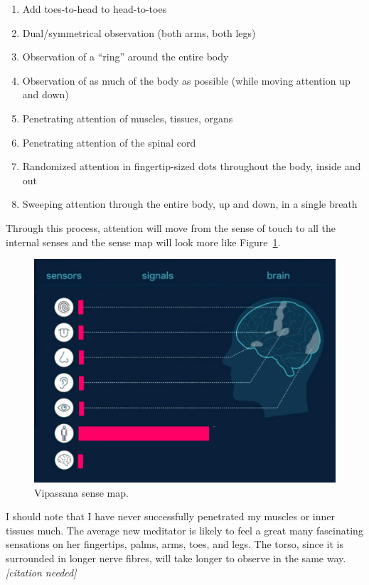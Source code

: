\documentclass{article}
\begin{document}
\begin{enumerate}
  \item Add toes-to-head to head-to-toes
  \item Dual/symmetrical observation (both arms, both legs)
  \item Observation of a ``ring'' around the entire body
  \item Observation of as much of the body as possible (while moving attention up and down)
  \item Penetrating attention of muscles, tissues, organs
  \item Penetrating attention of the spinal cord
  \item Randomized attention in fingertip-sized dots throughout the body, inside and out
  \item Sweeping attention through the entire body, up and down, in a single breath
\end{enumerate}

Through this process, attention will move from the sense of touch to all the internal senses and the sense map will look more like Figure~\ref{fig:vipassana-sense-map-1}.

\begin{figure}[H]
  \centering
  \includegraphics[width=\linewidth]{images/ma-vipassana1.png}
  \caption{Vipassana sense map.}
  \label{fig:vipassana-sense-map-1}
\end{figure}

I should note that I have never successfully penetrated my muscles or inner tissues much. The average new meditator is likely to feel a great many fascinating sensations on her fingertips, palms, arms, toes, and legs. The torso, since it is surrounded in longer nerve fibres, will take longer to observe in the same way. \textit{[citation needed]}
\end{document}

